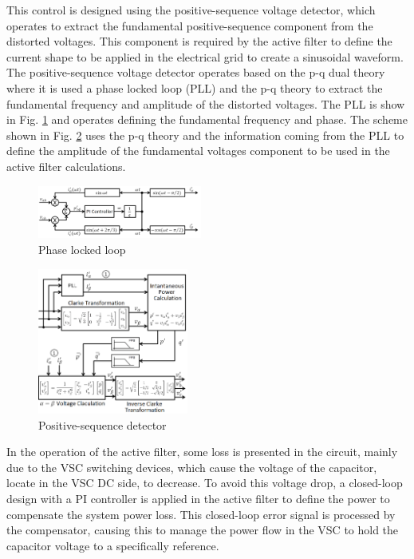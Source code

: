 This control is designed using the positive-sequence voltage detector, which operates to extract the fundamental positive-sequence component from the distorted voltages. This component is required by the active filter to define the current shape to be applied in the electrical grid to create a sinusoidal waveform. 
The positive-sequence voltage detector operates based on the p-q dual theory where it is used a phase locked loop (PLL) and the p-q theory to extract the fundamental frequency and amplitude of the distorted voltages. The PLL is show in Fig. \ref{fig:PLL.png} and operates defining the fundamental frequency and phase. The scheme shown in Fig. \ref{fig:detector_seq_positiva.png} uses the p-q theory and the information coming from the PLL to define the amplitude of the fundamental voltages component to be used in the active filter calculations.


\begin{figure}[!b]
	\centering
	\includegraphics[width=0.48\textwidth]{Figures/PLL.png}
	\caption{Phase locked loop}
	\label{fig:PLL.png}
\end{figure}

\begin{figure}[!b]
	\centering
	\includegraphics[width=0.44\textwidth]{Figures/detector_seq_positiva.png}
	\caption{Positive-sequence detector}
	\label{fig:detector_seq_positiva.png}
\end{figure}

In the operation of the active filter, some loss is presented in the circuit, mainly due to the VSC switching devices, which cause the voltage of the capacitor, locate in the VSC DC side, to decrease. To avoid this voltage drop, a closed-loop design with a PI controller is applied in the active filter to define the power to compensate the system power loss. This closed-loop error signal is processed by the compensator, causing this to manage the power flow in the VSC to hold the capacitor voltage to a specifically reference.